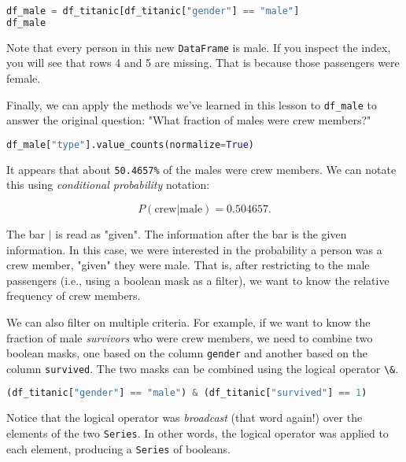 \begin{lstlisting}[language=Python]
df_male = df_titanic[df_titanic["gender"] == "male"]
df_male
\end{lstlisting}




Note that every person in this new \verb|DataFrame| is male. If you inspect the index, you will see that rows 4 and 5 are missing. That is because those passengers were female.



Finally, we can apply the methods we've learned in this lesson to \verb|df_male| to answer the original question: "What fraction of males were crew members?"

\begin{lstlisting}[language=Python]
df_male["type"].value_counts(normalize=True)
\end{lstlisting}




It appears that about \verb|50.4657%| of the males were crew members. We can notate this using \textit{conditional probability} notation:

$$ P(\text{crew} | \text{male}) = 0.504657. $$

The bar $|$ is read as "given". The information after the bar is the given information. In this case, we were interested in the probability a person was a crew member, "given" they were male. That is, after restricting to the male passengers (i.e., using a boolean mask as a filter), we want to know the relative frequency of crew members.



We can also filter on multiple criteria. For example, if we want to know the fraction of male \textit{survivors} who were crew members, we need to combine two boolean masks, one based on the column \verb|gender| and another based on the column \verb|survived|. The two masks can be combined using the logical operator \verb|\&|.

\begin{lstlisting}[language=Python]
(df_titanic["gender"] == "male") & (df_titanic["survived"] == 1)
\end{lstlisting}




Notice that the logical operator was \textit{broadcast} (that word again!) over the elements of the two \verb|Series|. In other words, the logical operator was applied to each element, producing a \verb|Series| of booleans.

